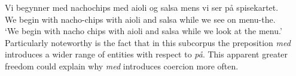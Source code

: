 \documentclass{article}
\begin{document}
        \ea \label{sent:initiation_med_3} %
        \gll Vi begynner med nachochips med aioli og salsa mens vi ser på spisekartet.\\
        We begin with nacho-chips with aioli and salsa while we see on menu-the.\\
        \glt ‘We begin with nacho chips with aioli and salsa while we look at the menu.’
        \z
Particularly noteworthy is the fact that in this subcorpus the preposition \emph{med} introduces a wider range of entities with respect to \emph{på}. This apparent greater freedom could explain why \emph{med} introduces coercion more often. 
\end{document}
